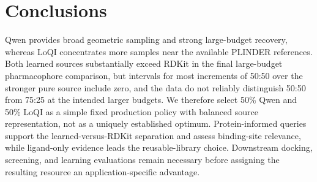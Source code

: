 \section{Conclusions}
\label{sec:conclusions}

Qwen provides broad geometric sampling and strong large-budget recovery, whereas
LoQI concentrates more samples near the available PLINDER references. Both learned
sources substantially exceed RDKit in the final large-budget pharmacophore comparison,
but intervals for most increments of 50:50 over the stronger pure source include zero,
and the data do not reliably distinguish 50:50 from 75:25 at the intended larger
budgets. We therefore select 50\% Qwen and 50\% LoQI as a simple fixed production
policy with balanced source representation, not as a uniquely established optimum.
Protein-informed queries support the learned-versus-RDKit separation and assess
binding-site relevance, while ligand-only evidence leads the reusable-library choice.
Downstream docking, screening, and learning evaluations remain necessary before
assigning the resulting resource an application-specific advantage.

